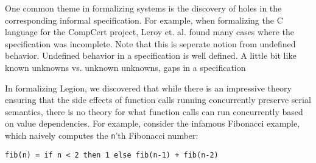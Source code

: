 \documentclass[sigplan]{acmart}
\begin{document}
One common theme in formalizing systems is the discovery of holes in the
corresponding informal specification. For example, when formalizing the C
language for the CompCert project, Leroy et. al. found many cases where the
specification was incomplete. Note that this is seperate notion from undefined
behavior. Undefined behavior in a specification is well defined. A little bit
like known unknowns vs. unknown unknowns, gaps in a specification  

In formalizing Legion, we discovered that while there is an impressive theory
ensuring that the side effects of function calls running concurrently preserve
serial semantics, there is no theory for what function calls can run
concurrently based on value dependencies. For example, consider the infamous
Fibonacci example, which naively computes the \texttt{n}'th Fibonacci number: 

\begin{lstlisting}
fib(n) = if n < 2 then 1 else fib(n-1) + fib(n-2)
\end{lstlisting}
 
 
 
\end{document}
